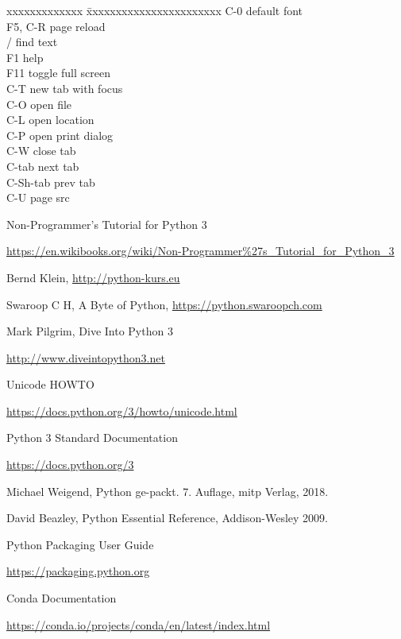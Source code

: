\documentclass[9pt,a4wide]{extarticle}
\begin{document}
\begin{tabbing}
    xxxxxxxxxxxxx \= xxxxxxxxxxxxxxxxxxxxxxx \kill
    C-0           \> default font   \\
    F5, C-R       \> page reload  \\
    /             \> find text  \\
    F1            \> help   \\
    F11           \> toggle full screen  \\
    C-T           \> new tab with focus  \\
    C-O           \> open file  \\
    C-L           \> open location  \\
    C-P           \> open print dialog   \\
    C-W           \> close tab  \\
    C-tab         \> next tab  \\
    C-Sh-tab      \> prev tab  \\
    C-U           \> page src  \\
\end{tabbing}
    




\begin{thebibliography}{zzzz}

 Non-Programmer's Tutorial for Python 3

   \url{https://en.wikibooks.org/wiki/Non-Programmer%27s_Tutorial_for_Python_3}

 Bernd Klein, \url{http://python-kurs.eu}

 Swaroop C H, A Byte of Python, \url{https://python.swaroopch.com}

 Mark Pilgrim, Dive Into Python 3

    \url{http://www.diveintopython3.net}

 Unicode HOWTO

    \url{https://docs.python.org/3/howto/unicode.html}

 Python 3 Standard Documentation

    \url{https://docs.python.org/3}

 Michael Weigend, Python ge-packt. 7. Auflage, mitp Verlag, 2018.

 David Beazley, Python Essential Reference, Addison-Wesley 2009.

 Python Packaging User Guide

    \url{https://packaging.python.org}

 Conda Documentation

    \url{https://conda.io/projects/conda/en/latest/index.html}

\end{thebibliography}
\end{document}

